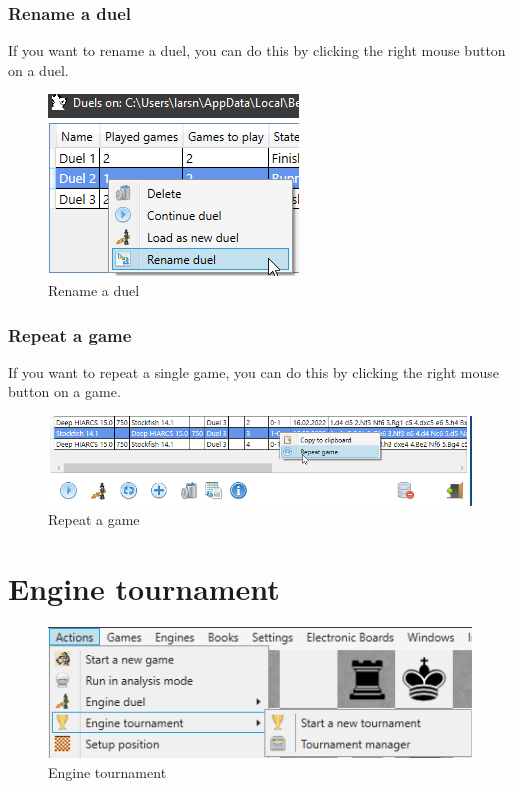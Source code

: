 \documentclass[11pt,a4paper]{article}
\begin{document}
\subsubsection{Rename a duel}
If you want to rename a duel, you can do this by clicking the right mouse button on a duel.

\begin{figure}[H]
	\centering
	\includegraphics[scale=1.0]{EngineDuel8.png}
	\caption{Rename a duel}
	\label{fig:EngineDuel8}
\end{figure}


\subsubsection{Repeat a game}
If you want to repeat a single game, you can do this by clicking the right mouse button on a game.

\begin{figure}[H]
	\centering
	\includegraphics[scale=0.6]{EngineDuel7.png}
	\caption{Repeat a game}
	\label{fig:EngineDuel7}
\end{figure}

\section{Engine tournament} \label{EngineTournamentl}

\begin{figure}[H]
	\centering
	\includegraphics[scale=1.0]{EngineTournament.png}
	\caption{Engine tournament}
	\label{fig:EngineTournament}
\end{figure}
\end{document}
